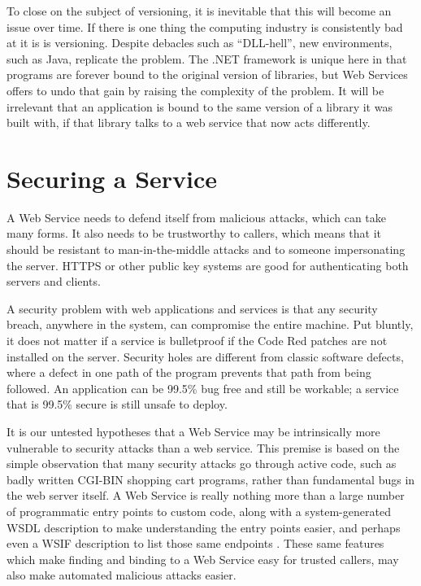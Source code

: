\documentclass[draft]{report}
\begin{document}
To close on the subject of versioning, it is inevitable that this will
become an issue over time. If there is one thing the computing industry
is consistently bad at it is is versioning. Despite debacles such as
``DLL-hell'', new environments, such as Java, replicate the problem. The
.NET framework is unique here in that programs are forever bound to the
original version of libraries, but Web Services offers to undo that gain
by raising the complexity of the problem. It will be irrelevant that an
application is bound to the same version of a library it was built with,
if that library talks to a web service that now acts differently.



\chapter{Securing a Service}

A Web Service needs to defend itself from malicious attacks, which can
take many forms. It also needs to be trustworthy to callers, which means
that it should be resistant to man-in-the-middle attacks and to someone
impersonating the server. HTTPS or other public key systems are good for
authenticating both servers and clients.

A security problem with web applications and services is that any
security breach, anywhere in the system, can compromise the entire
machine. Put bluntly, it does not matter if a service is bulletproof if
the Code Red patches are not installed on the server. Security holes are
different from classic software defects, where a defect in one path of
the program prevents that path from being followed. An application can
be 99.5\% bug free and still be workable; a service that is 99.5\%
secure is still unsafe to deploy.

It is our untested hypotheses that a Web Service may be intrinsically
more vulnerable to security attacks than a web service. This premise is
based on the simple observation that many security attacks go through
active code, such as badly written CGI-BIN shopping cart programs,
rather than fundamental bugs in the web server itself. A Web Service is
really nothing more than a large number of programmatic entry points to
custom code, along with a system-generated WSDL description to make
understanding the entry points easier, and perhaps even a WSIF
description to list those same endpoints \cite{spec:WSIF}. These same
features which make finding and binding to a Web Service easy for
trusted callers, may also make automated malicious attacks easier.
\end{document}
